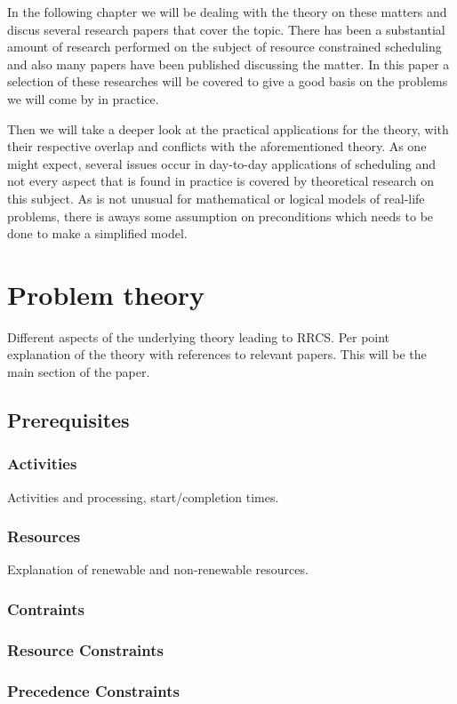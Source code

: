 \documentclass{article}
\begin{document}
In the following chapter we will be dealing with the theory on these matters and discus several research papers that cover the topic. There has been a substantial amount of research performed on the subject of resource constrained scheduling and also many papers have been published discussing the matter. In this paper a selection of these researches will be covered to give a good basis on the problems we will come by in practice.

Then we will take a deeper look at the practical applications for the theory, with their respective overlap and conflicts with the aforementioned theory. As one might expect, several issues occur in day-to-day applications of scheduling and not every aspect that is found in practice is covered by theoretical research on this subject. As is not unusual for mathematical or logical models of real-life problems, there is aways some assumption on preconditions which needs to be done to make a simplified model.


\newpage

\section{Problem theory}

Different aspects of the underlying theory leading to RRCS.  Per point explanation of the theory with references to relevant papers. This will be the main section of the paper.

\subsection{Prerequisites}
\subsubsection{Activities}
Activities and processing, start/completion times. 
\subsubsection{Resources}
Explanation of renewable and non-renewable resources.
\subsubsection{Contraints}
\subsubsection{Resource Constraints}
\subsubsection{Precedence Constraints}
\end{document}
